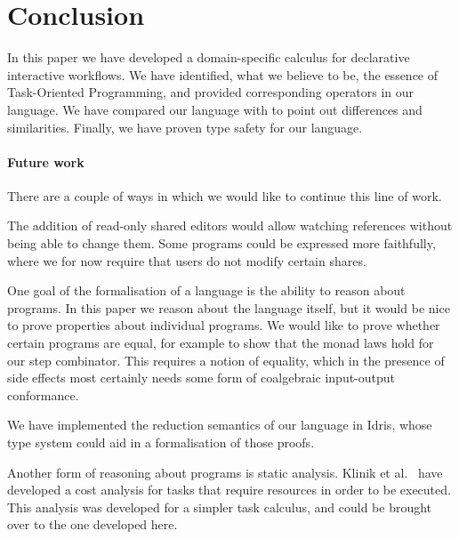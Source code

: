 
\section{Conclusion}

\label{sec:conclusions}

In this paper we have developed a domain-specific calculus for declarative interactive workflows.
We have identified, what we believe to be, the essence of Task-Oriented Programming, and provided corresponding operators in our language.
We have compared our language with \CSP to point out differences and similarities.
Finally, we have proven type safety for our language.



\paragraph{Future work}

There are a couple of ways in which we would like to continue this line of work.

The addition of read-only shared editors would allow watching references without being able to change them.
Some programs could be expressed more faithfully, where we for now require that users do not modify certain shares.

One goal of the formalisation of a language is the ability to reason about programs.
In this paper we reason about the language itself, but it would be nice to prove properties about individual programs.
We would like to prove whether certain programs are equal, for example to show that the monad laws hold for our step combinator.
This requires a notion of equality, which in the presence of side effects most certainly needs some form of coalgebraic input-output conformance.

We have implemented the reduction semantics of our language in Idris, whose type system could aid in a formalisation of those proofs.

Another form of reasoning about programs is static analysis.
Klinik et al.~\cite{conf/ifl/KlinikJP17} have developed a cost analysis for tasks that require resources in order to be executed.
This analysis was developed for a simpler task calculus, and could be brought over to the one developed here.

